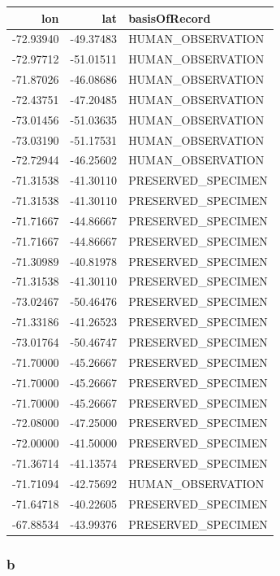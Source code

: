 \documentclass[]{book}
\begin{document}
\begin{tabular}{r|r|l}
\hline
lon & lat & basisOfRecord\\
\hline
-72.93940 & -49.37483 & HUMAN\_OBSERVATION\\
\hline
-72.97712 & -51.01511 & HUMAN\_OBSERVATION\\
\hline
-71.87026 & -46.08686 & HUMAN\_OBSERVATION\\
\hline
-72.43751 & -47.20485 & HUMAN\_OBSERVATION\\
\hline
-73.01456 & -51.03635 & HUMAN\_OBSERVATION\\
\hline
-73.03190 & -51.17531 & HUMAN\_OBSERVATION\\
\hline
-72.72944 & -46.25602 & HUMAN\_OBSERVATION\\
\hline
-71.31538 & -41.30110 & PRESERVED\_SPECIMEN\\
\hline
-71.31538 & -41.30110 & PRESERVED\_SPECIMEN\\
\hline
-71.71667 & -44.86667 & PRESERVED\_SPECIMEN\\
\hline
-71.71667 & -44.86667 & PRESERVED\_SPECIMEN\\
\hline
-71.30989 & -40.81978 & PRESERVED\_SPECIMEN\\
\hline
-71.31538 & -41.30110 & PRESERVED\_SPECIMEN\\
\hline
-73.02467 & -50.46476 & PRESERVED\_SPECIMEN\\
\hline
-71.33186 & -41.26523 & PRESERVED\_SPECIMEN\\
\hline
-73.01764 & -50.46747 & PRESERVED\_SPECIMEN\\
\hline
-71.70000 & -45.26667 & PRESERVED\_SPECIMEN\\
\hline
-71.70000 & -45.26667 & PRESERVED\_SPECIMEN\\
\hline
-71.70000 & -45.26667 & PRESERVED\_SPECIMEN\\
\hline
-72.08000 & -47.25000 & PRESERVED\_SPECIMEN\\
\hline
-72.00000 & -41.50000 & PRESERVED\_SPECIMEN\\
\hline
-71.36714 & -41.13574 & PRESERVED\_SPECIMEN\\
\hline
-71.71094 & -42.75692 & HUMAN\_OBSERVATION\\
\hline
-71.64718 & -40.22605 & PRESERVED\_SPECIMEN\\
\hline
-67.88534 & -43.99376 & PRESERVED\_SPECIMEN\\
\hline
\end{tabular}

\hypertarget{b}{%
\subsubsection{b}\label{b}}
\end{document}
